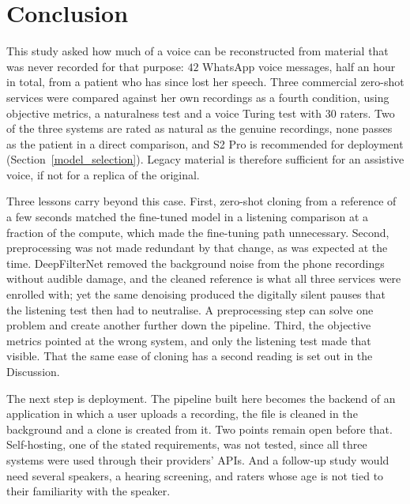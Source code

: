 \section*{Conclusion}
\label{conclusion}

This study asked how much of a voice can be reconstructed from material that was
never recorded for that purpose: $42$ WhatsApp voice messages, half an hour in
total, from a patient who has since lost her speech. Three commercial zero-shot
services were compared against her own recordings as a fourth condition, using
objective metrics, a naturalness test and a voice Turing test with $30$ raters.
Two of the three systems are rated as natural as the genuine recordings, none
passes as the patient in a direct comparison, and S2 Pro is recommended for
deployment (Section~\ref{model_selection}). Legacy material is therefore
sufficient for an assistive voice, if not for a replica of the original.

Three lessons carry beyond this case. First, zero-shot cloning from a reference
of a few seconds matched the fine-tuned model in a listening comparison at a
fraction of the compute, which made the fine-tuning path unnecessary. Second,
preprocessing was not made redundant by that change, as was expected at the
time. DeepFilterNet removed the background noise from the phone recordings
without audible damage, and the cleaned reference is what all three services
were enrolled with; yet the same denoising produced the digitally silent pauses
that the listening test then had to neutralise. A preprocessing step can solve
one problem and create another further down the pipeline. Third, the objective
metrics pointed at the wrong system, and only the listening test made that
visible. That the same ease of cloning has a second reading is set out in the
Discussion.

The next step is deployment. The pipeline built here becomes the backend of an
application in which a user uploads a recording, the file is cleaned in the
background and a clone is created from it. Two points remain open before that.
Self-hosting, one of the stated requirements, was not tested, since all three
systems were used through their providers' APIs. And a follow-up study would
need several speakers, a hearing screening, and raters whose age is not tied to
their familiarity with the speaker.
